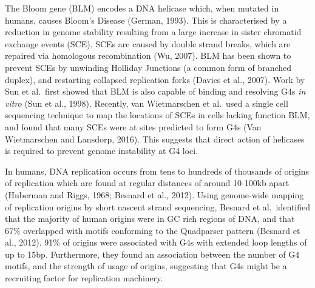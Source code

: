 \documentclass[12pt,a4paper,]{report}
\begin{document}
The Bloom gene (BLM) encodes a DNA helicase which, when mutated in
humans, causes Bloom's Disease (German, 1993). This is characterised by
a reduction in genome stability resulting from a large increase in
sister chromatid exchange events (SCE). SCEs are caused by double strand
breaks, which are repaired via homologous recombination (Wu, 2007). BLM
has been shown to prevent SCEs by unwinding Holliday Junctions (a common
form of branched duplex), and restarting collapsed replication forks
(Davies et al., 2007). Work by Sun et al.~first showed that BLM is also
capable of binding and resolving G4s \emph{in vitro} (Sun et al., 1998).
Recently, van Wietmarschen et al.~used a single cell sequencing
technique to map the locations of SCEs in cells lacking function BLM,
and found that many SCEs were at sites predicted to form G4s (Van
Wietmarschen and Lansdorp, 2016). This suggests that direct action of
helicases is required to prevent genome instability at G4 loci.

In humans, DNA replication occurs from tens to hundreds of thousands of
origins of replication which are found at regular distances of around
10-100kb apart (Huberman and Riggs, 1968; Besnard et al., 2012). Using
genome-wide mapping of replication origins by short nascent strand
sequencing, Besnard et al.~identified that the majority of human origins
were in GC rich regions of DNA, and that 67\% overlapped with motifs
conforming to the Quadparser pattern (Besnard et al., 2012). 91\% of
origins were associated with G4s with extended loop lengths of up to
15bp. Furthermore, they found an association between the number of G4
motifs, and the strength of usage of origins, suggesting that G4s might
be a recruiting factor for replication machinery.

\newpage
\end{document}
